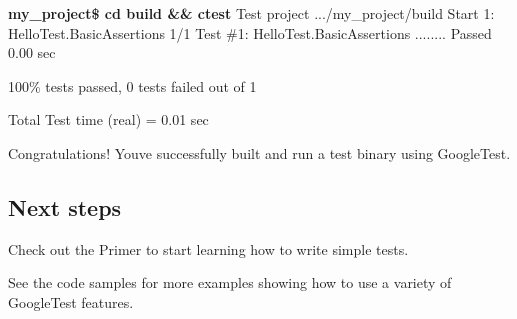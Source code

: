 \begin{DoxyPre}{\bfseries my\_project\$ cd build \&\& ctest}
Test project .../my\_project/build
    Start 1: HelloTest.BasicAssertions
1/1 Test \#1: HelloTest.BasicAssertions ........   Passed    0.00 sec\end{DoxyPre}



\begin{DoxyPre}100\% tests passed, 0 tests failed out of 1\end{DoxyPre}



\begin{DoxyPre}Total Test time (real) =   0.01 sec
\end{DoxyPre}


Congratulations! You\textquotesingle{}ve successfully built and run a test binary using Google\+Test.

\subsection*{Next steps}


\begin{DoxyItemize}
\item Check out the Primer to start learning how to write simple tests.
\item See the code samples for more examples showing how to use a variety of Google\+Test features. 
\end{DoxyItemize}